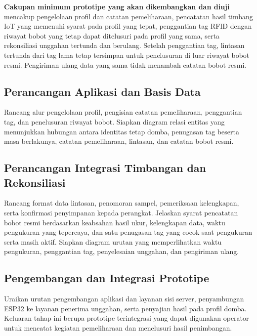 \documentclass[12pt,a4paper]{report}
\begin{document}
\textbf{Cakupan minimum prototipe yang akan dikembangkan dan diuji}
mencakup pengelolaan profil dan catatan pemeliharaan, pencatatan hasil
timbang IoT yang memenuhi syarat pada profil yang tepat, penggantian tag RFID
dengan riwayat bobot yang tetap dapat ditelusuri pada profil yang sama, serta
rekonsiliasi unggahan tertunda dan berulang. Setelah penggantian tag,
lintasan tertunda dari tag lama tetap tersimpan untuk penelusuran di luar
riwayat bobot resmi. Pengiriman ulang data yang sama tidak menambah catatan
bobot resmi.

\subsection{Perancangan Aplikasi dan Basis Data}
Rancang alur pengelolaan profil, pengisian catatan pemeliharaan, penggantian
tag, dan penelusuran riwayat bobot. Siapkan diagram relasi entitas yang
menunjukkan hubungan antara identitas tetap domba, penugasan tag beserta masa
berlakunya, catatan pemeliharaan, lintasan, dan catatan bobot resmi.

\subsection{Perancangan Integrasi Timbangan dan Rekonsiliasi}
Rancang format data lintasan, penomoran sampel, pemeriksaan kelengkapan,
serta konfirmasi penyimpanan kepada perangkat. Jelaskan syarat pencatatan
bobot resmi berdasarkan keabsahan hasil ukur, kelengkapan data, waktu
pengukuran yang tepercaya, dan satu penugasan tag yang cocok saat pengukuran
serta masih aktif. Siapkan diagram urutan yang memperlihatkan waktu
pengukuran, penggantian tag, penyelesaian unggahan, dan pengiriman ulang.

\subsection{Pengembangan dan Integrasi Prototipe}
Uraikan urutan pengembangan aplikasi dan layanan sisi server, penyambungan
ESP32 ke layanan penerima unggahan, serta penyajian hasil pada profil domba.
Keluaran tahap ini berupa prototipe terintegrasi yang dapat digunakan operator
untuk mencatat kegiatan pemeliharaan dan menelusuri hasil penimbangan.
\end{document}
